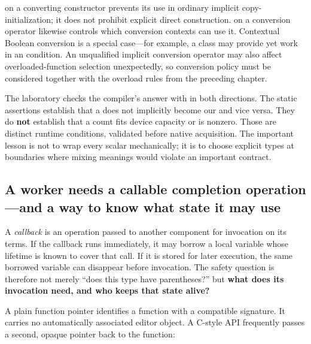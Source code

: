  on a converting constructor prevents its use in ordinary implicit copy-initialization; it does not prohibit explicit direct construction.  on a conversion operator likewise controls which conversion contexts can use it. Contextual Boolean conversion is a special case---for example, a class may provide  yet work in an  condition. An unqualified implicit conversion operator may also affect overloaded-function selection unexpectedly, so conversion policy must be considered together with the overload rules from the preceding chapter.

The laboratory checks the compiler's answer with  in both directions. The static assertions establish that a  does not implicitly become our  and vice versa. They do \textbf{not} establish that a count fits device capacity or is nonzero. Those are distinct runtime conditions, validated before native acquisition. The important lesson is not to wrap every scalar mechanically; it is to choose explicit types at boundaries where mixing meanings would violate an important contract.

\subsection{A worker needs a callable completion operation---and a way to know what state it may use}\label{01-foundations-i-ch004-a-worker-needs-a-callable-completion-operationand-a-way-to-know-what-state-it-may-use}

\hypertarget{01-foundations-i-ch004-a-worker-needs-a-callable-completion-operationand-a-way-to-know-what-state-it-may-use}{}

A \emph{callback} is an operation passed to another component for invocation on its terms. If the callback runs immediately, it may borrow a local variable whose lifetime is known to cover that call. If it is stored for later execution, the same borrowed variable can disappear before invocation. The safety question is therefore not merely ``does this type have parentheses?'' but \textbf{what does its invocation need, and who keeps that state alive?}

A plain function pointer identifies a function with a compatible signature. It carries no automatically associated editor object. A C-style API frequently passes a second, opaque pointer back to the function:


